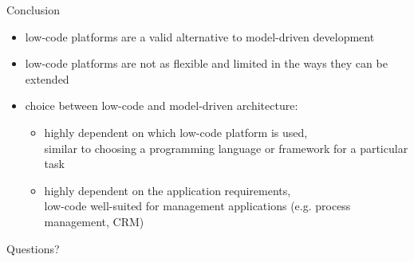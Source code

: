 \documentclass[aspectratio=169]{beamer}
\begin{document}
  \begin{frame}{Conclusion}
    \begin{itemize}
      \item low-code platforms are a valid alternative to model-driven development
      \item low-code platforms are not as flexible and limited in the ways they can be extended
      \item choice between low-code and model-driven architecture:
        \begin{itemize}
          \item highly dependent on which low-code platform is used, \\
                similar to choosing a programming language or framework for a particular task
          \item highly dependent on the application requirements, \\
                low-code well-suited for management applications (e.g. process management, CRM)
        \end{itemize}
    \end{itemize}
  \end{frame}


  \begin{frame}[standout]
    Questions?
  \end{frame}
\end{document}
